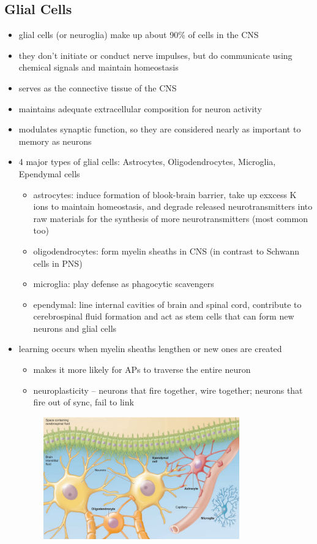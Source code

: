 \documentclass[10pt]{article}
\begin{document}
\subsection{Glial Cells}
\begin{itemize}
    \item glial cells (or neuroglia) make up about 90\% of cells in the CNS 
    \item they don't initiate or conduct nerve impulses, but do communicate using chemical signals and maintain homeostasis
    \item serves as the connective tissue of the CNS
    \item maintains adequate extracellular composition for neuron activity
    \item modulates synaptic function, so they are considered nearly as important to memory as neurons
    \item 4 major types of glial cells: Astrocytes, Oligodendrocytes, Microglia, Ependymal cells
        \begin{itemize}
            \item astrocytes: induce formation of blook-brain barrier, take up exxcess K ions to maintain homeostasis, and degrade released neurotransmitters into raw materials for the synthesis of more neurotransmitters (most common too)
            \item oligodendrocytes: form myelin sheaths in CNS (in contrast to Schwann cells in PNS)
            \item microglia: play defense as phagocytic scavengers
            \item ependymal: line internal cavities of brain and spinal cord, contribute to cerebrospinal fluid formation and act as stem cells that can form new neurons and glial cells
        \end{itemize}
    \item learning occurs when myelin sheaths lengthen or new ones are created
        \begin{itemize}
            \item makes it more likely for APs to traverse the entire neuron 
            \item neuroplasticity -- neurons that fire together, wire together; neurons that fire out of sync, fail to link
        \end{itemize}
        \begin{figure}[h]
            \centering
            \includegraphics[width=0.8\textwidth]{glialCellsCNS}

\end{figure}
\end{itemize}
\end{document}
